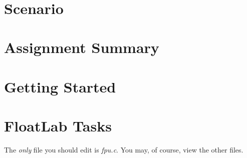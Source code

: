 




\renewcommand{\labnumber}{\floatlabnumber}
\renewcommand{\labname}{Floating Point Representation and Arithmetic Lab}
\renewcommand{\shortlabname}{floatlab}
\renewcommand{\collaborationrules}{\floatlabcollaboration}
\renewcommand{\duedate}{\floatlabdue}

\pagelayout

    \labidentifier\


    \softwareengineeringfrontmatter

    \section*{Scenario}                                         \WriteAnFPU

    \section{Assignment Summary}                                

    \section{Getting Started}                                   

    \section*{FloatLab Tasks}

    The \textit{only} file you should edit is \textit{fpu.c}.
    You may, of course, view the other files.

